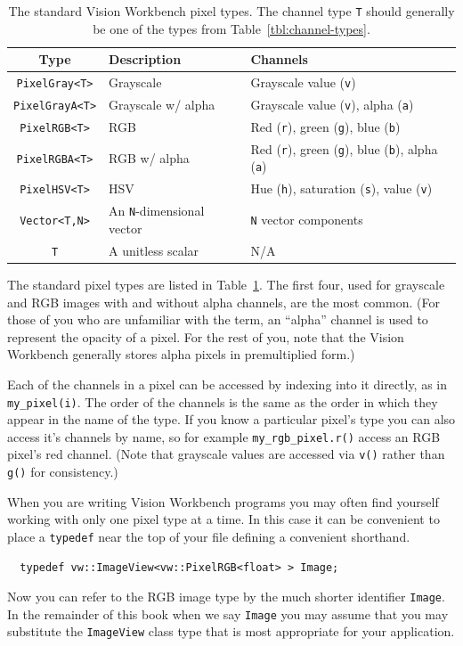 \begin{table}[t]\begin{centering}
\begin{tabular}{|c|l|l|} \hline
Type & Description & Channels \\ \hline \hline
\verb#PixelGray<T># & Grayscale & Grayscale value (\verb#v#) \\ \hline
\verb#PixelGrayA<T># & Grayscale w/ alpha & Grayscale value (\verb#v#), alpha (\verb#a#) \\ \hline
\verb#PixelRGB<T># & RGB & Red (\verb#r#), green (\verb#g#), blue (\verb#b#) \\ \hline
\verb#PixelRGBA<T># & RGB w/ alpha &  Red (\verb#r#), green (\verb#g#), blue (\verb#b#), alpha (\verb#a#) \\ \hline
\verb#PixelHSV<T># & HSV & Hue (\verb#h#), saturation (\verb#s#), value (\verb#v#) \\ \hline
\verb#Vector<T,N># & An \verb#N#-dimensional vector & \verb#N# vector components \\ \hline
\verb#T# & A unitless scalar & N/A \\ \hline
\end{tabular}
\caption{The standard Vision Workbench pixel types.  The channel 
type {\tt T} should generally be one of the types from Table~\ref{tbl:channel-types}.}
\label{tbl:pixel-types}
\end{centering}\end{table}

The standard pixel types are listed in Table~\ref{tbl:pixel-types}.
The first four, used for grayscale and RGB images with and without
alpha channels, are the most common.  (For those of you who are 
unfamiliar with the term, an ``alpha'' channel is used to represent 
the opacity of a pixel.  For the rest of you, note that the Vision 
Workbench generally stores alpha pixels in premultiplied form.)

Each of the channels in a pixel can be accessed by indexing into it
directly, as in \verb#my_pixel(i)#.  The order of the channels is the
same as the order in which they appear in the name of the type.  If
you know a particular pixel's type you can also access it's channels
by name, so for example \verb#my_rgb_pixel.r()# access an RGB pixel's
red channel.  (Note that grayscale values are accessed via \verb#v()#
rather than \verb#g()# for consistency.)

When you are writing Vision Workbench programs you may often find 
yourself working with only one pixel type at a time.  In this case 
it can be convenient to place a \verb#typedef# near the top of your 
file defining a convenient shorthand.
\begin{verbatim}
  typedef vw::ImageView<vw::PixelRGB<float> > Image;
\end{verbatim}
Now you can refer to the RGB image type by the much shorter identifier 
\verb#Image#.  In the remainder of this book when we say \verb#Image# 
you may assume that you may substitute the \verb#ImageView# class type 
that is most appropriate for your application.

